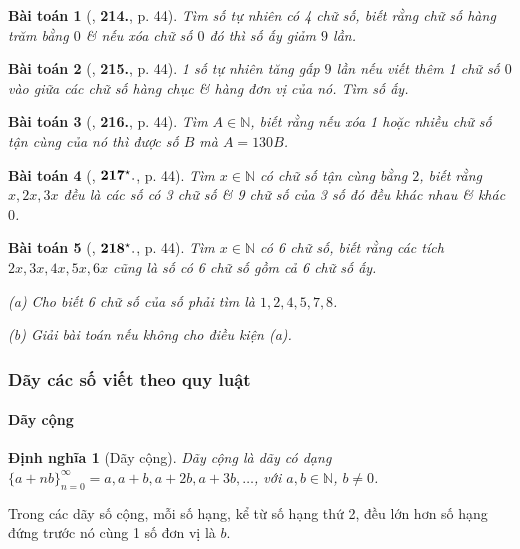 \documentclass{article}
\numberwithin{equation}{section}
\newtheorem{dinhnghia}{Định nghĩa}[section]
\newtheorem{baitoan}{Bài toán}[section]
\begin{document}
\begin{baitoan}[\cite{Binh_Toan_6_tap_1}, \textbf{214.}, p. 44]
	Tìm số tự nhiên có 4 chữ số, biết rằng chữ số hàng trăm bằng $0$ \& nếu xóa chữ số $0$ đó thì số ấy giảm $9$ lần.
\end{baitoan}

\begin{baitoan}[\cite{Binh_Toan_6_tap_1}, \textbf{215.}, p. 44]
	1 số tự nhiên tăng gấp $9$ lần nếu viết thêm 1 chữ số $0$ vào giữa các chữ số hàng chục \& hàng đơn vị của nó. Tìm số ấy.
\end{baitoan}

\begin{baitoan}[\cite{Binh_Toan_6_tap_1}, \textbf{216.}, p. 44]
	Tìm $A\in\mathbb{N}$, biết rằng nếu xóa 1 hoặc nhiều chữ số tận cùng của nó thì được số $B$ mà $A = 130B$.
\end{baitoan}

\begin{baitoan}[\cite{Binh_Toan_6_tap_1}, $\bf 217^\star.$, p. 44]
	Tìm $x\in\mathbb{N}$ có chữ số tận cùng bằng $2$, biết rằng $x,2x,3x$ đều là các số có 3 chữ số \& 9 chữ số của 3 số đó đều khác nhau \& khác $0$.
\end{baitoan}

\begin{baitoan}[\cite{Binh_Toan_6_tap_1}, $\bf 218^\star.$, p. 44]
	Tìm $x\in\mathbb{N}$ có 6 chữ số, biết rằng các tích $2x,3x,4x,5x,6x$ cũng là số có 6 chữ số gồm cả 6 chữ số ấy.
	\begin{enumerate*}
		\item[(a)] Cho biết 6 chữ số của số phải tìm là $1,2,4,5,7,8$.
		\item[(b)] Giải bài toán nếu không cho điều kiện (a).
	\end{enumerate*}
\end{baitoan}

\subsubsection{Dãy các số viết theo quy luật}

\paragraph{Dãy cộng}

\begin{dinhnghia}[Dãy cộng]
	\emph{Dãy cộng} là dãy có dạng $\{a + n b\}_{n=0}^\infty = a, a + b, a + 2b, a + 3b,\ldots$, với $a,b\in\mathbb{N}$, $b\ne 0$.
\end{dinhnghia}
Trong các dãy số cộng, mỗi số hạng, kể từ số hạng thứ 2, đều lớn hơn số hạng đứng trước nó cùng 1 số đơn vị là $b$.
\end{document}

